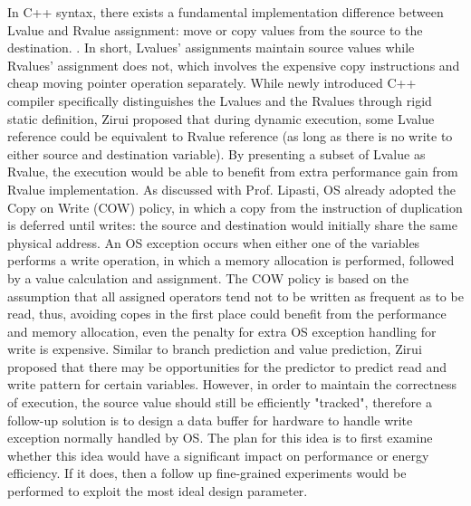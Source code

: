 \documentclass[9pt]{article}
\begin{document}
In C++ syntax, there exists a fundamental implementation difference between Lvalue and Rvalue assignment: move or copy values from the source to the destination. \cite{rvalue_intro, rvalue_ref}. In short, Lvalues' assignments maintain source values while Rvalues' assignment does not, which involves the expensive copy instructions and cheap moving pointer operation separately. While newly introduced C++ compiler specifically distinguishes the Lvalues and the Rvalues through rigid static definition, Zirui proposed that during dynamic execution, some Lvalue reference could be equivalent to Rvalue reference (as long as there is no write to either source and destination variable). By presenting a subset of Lvalue as Rvalue, the execution would be able to benefit from extra performance gain from Rvalue implementation. As discussed with Prof. Lipasti, OS already adopted the Copy on Write (COW) \cite{wiki:Copy-on-write} policy, in which a copy from the instruction of duplication is deferred until writes: the source and destination would initially share the same physical address. An OS exception occurs when either one of the variables performs a write operation, in which a memory allocation is performed, followed by a value calculation and assignment. The COW policy is based on the assumption that all assigned operators tend not to be written as frequent as to be read, thus, avoiding copes in the first place could benefit from the performance and memory allocation, even the penalty for extra OS exception handling for write is expensive. Similar to branch prediction and value prediction, Zirui proposed that there may be opportunities for the predictor to predict read and write pattern for certain variables. However, in order to maintain the correctness of execution, the source value should still be efficiently "tracked", therefore a follow-up solution is to design a data buffer for hardware to handle write exception normally handled by OS. The plan for this idea is to first examine whether this idea would have a significant impact on performance or energy efficiency. If it does, then a follow up fine-grained experiments would be performed to exploit the most ideal design parameter. 
\end{document}
